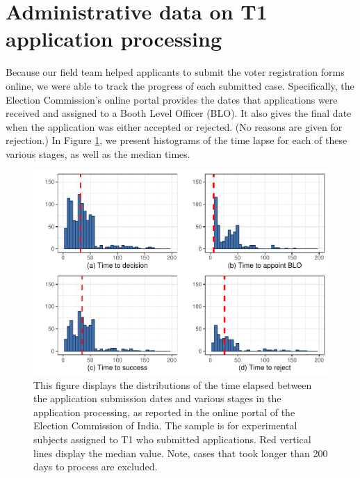 \documentclass[
  11.5pt,
]{article}
\begin{document}
\clearpage

\hypertarget{administrative-data-on-t1-application-processing}{%
\section{Administrative data on T1 application
processing}\label{administrative-data-on-t1-application-processing}}

Because our field team helped applicants to submit the voter
registration forms online, we were able to track the progress of each
submitted case. Specifically, the Election Commission's online portal
provides the dates that applications were received and assigned to a
Booth Level Officer (BLO). It also gives the final date when the
application was either accepted or rejected. (No reasons are given for
rejection.) In Figure \ref{fig:t1_admin_hist}, we present histograms of
the time lapse for each of these various stages, as well as the median
times.

\begin{figure}
\centering
\includegraphics{supplementary-information_files/figure-latex/unnamed-chunk-44-1.pdf}
\caption{\label{fig:t1_admin_hist}This figure displays the distributions
of the time elapsed between the application submission dates and various
stages in the application processing, as reported in the online portal
of the Election Commission of India. The sample is for experimental
subjects assigned to T1 who submitted applications. Red vertical lines
display the median value. Note, cases that took longer than 200 days to
process are excluded.}
\end{figure}

\clearpage
\end{document}

